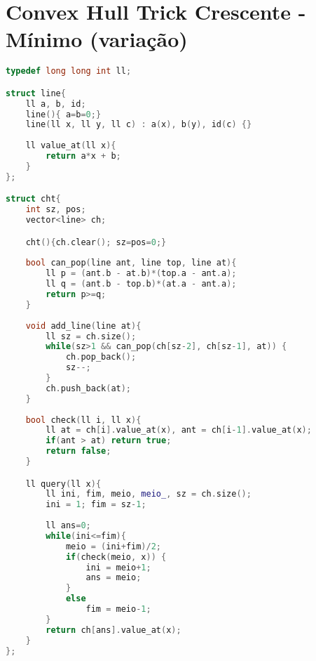 \documentclass[12pt,a4paper,twoside]{report}
\begin{document}
\section{Convex Hull Trick Crescente - Mínimo (variação)}
\noindent\begin{lstlisting}[caption=Convex Hull Trick Crescente - Mínimo(variação),language=C++]
typedef long long int ll;

struct line{
    ll a, b, id;
    line(){ a=b=0;}
    line(ll x, ll y, ll c) : a(x), b(y), id(c) {}
    
    ll value_at(ll x){
        return a*x + b;
    }
};

struct cht{
    int sz, pos;
    vector<line> ch;

    cht(){ch.clear(); sz=pos=0;}
      
    bool can_pop(line ant, line top, line at){
        ll p = (ant.b - at.b)*(top.a - ant.a);
        ll q = (ant.b - top.b)*(at.a - ant.a);
        return p>=q;
    }
    
    void add_line(line at){
        ll sz = ch.size();
        while(sz>1 && can_pop(ch[sz-2], ch[sz-1], at)) {
            ch.pop_back();
            sz--;
        }
        ch.push_back(at); 
    }
    
    bool check(ll i, ll x){ 
        ll at = ch[i].value_at(x), ant = ch[i-1].value_at(x);
        if(ant > at) return true;
        return false;
    }

    ll query(ll x){
        ll ini, fim, meio, meio_, sz = ch.size();
        ini = 1; fim = sz-1;
        
        ll ans=0;
        while(ini<=fim){
            meio = (ini+fim)/2;     
            if(check(meio, x)) {
                ini = meio+1;
                ans = meio;
            }
            else 
                fim = meio-1;
        }
        return ch[ans].value_at(x);
    }
};
\end{lstlisting}
\end{document}

